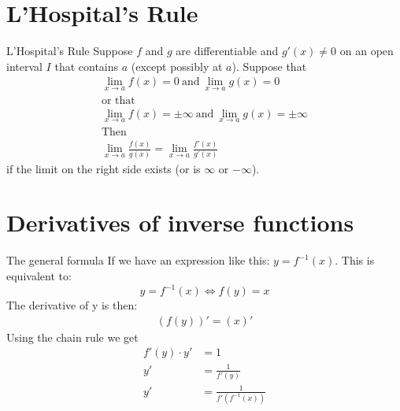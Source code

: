 \documentclass[letterpaper,10pt,twoside,twocolumn,openany]{book}
\begin{document}
\section{L'Hospital's Rule}
\begin{paperbox}{L'Hospital's Rule}
    Suppose $f$ and $g$ are differentiable and $g'(x) \neq 0$ on an open interval $I$ that contains $a$ (except possibly at $a$). Suppose that
    \begin{gather*}
        \lim_{x\to a} f(x) = 0\ \text{and}\ \lim_{x\to a} g(x) = 0\\
        \text{or that}\\
        \lim_{x\to a} f(x) = \pm\infty\ \text{and}\ \lim_{x\to a} g(x)= \pm\infty\\
        \text{Then}\\ 
        \lim_{x\to a}\frac{f(x)}{g(x)} = \lim_{x\to a} \frac{f'(x)}{g'(x)}
    \end{gather*}
    if the limit on the right side exists (or is $\infty$ or $-\infty$).
\end{paperbox}
\newpage
\section{Derivatives of inverse functions}
\begin{paperbox}{The general formula}
    If we have an expression like this: $ y = f^{-1}(x)$. This is equivalent to:
    \begin{equation}
        y = f^{-1}(x) \Leftrightarrow f(y) = x
    \end{equation}
    The derivative of y is then:
    \begin{align*}
        (f(y))' = (x)'
    \end{align*}
    Using the chain rule we get
    \begin{align*}
        f'(y)\cdot y' &= 1\\
        y' &= \frac{1}{f'(y)}\\
        y' &= \frac{1}{f'(f^{-1}(x))}
    \end{align*}    
\end{paperbox}
\end{document}
